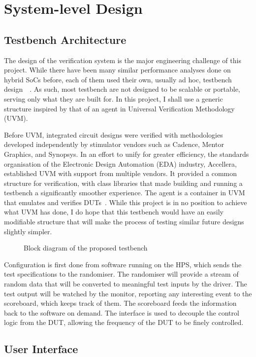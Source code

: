 \section{System-level Design}

\subsection{Testbench Architecture}
The design of the verification system is the major engineering challenge of this
project.
While there have been many similar performance analyses done on hybrid SoCs
before, each of them used their own, usually ad hoc, testbench
design~\cite{Shi1}~\cite{Li1}.
As such, most testbench are not designed to be scalable or portable, serving
only what they are built for.
In this project, I shall use a generic structure inspired by that of an agent
in Universal Verification Methodology (UVM).

Before UVM, integrated circuit designs were verified with methodologies
developed independently by stimulator vendors such as Cadence, Mentor Graphics,
and Synopsys.
In an effort to unify for greater efficiency, the standards organisation of the
Electronic Design Automation (EDA) industry, Accellera, established UVM with
support from multiple vendors.
It provided a common structure for verification, with class libraries that made
building and running a testbench a significantly smoother experience.
The agent is a container in UVM that emulates and verifies
DUTs~\cite{Accellera1}.
While this project is in no position to achieve what UVM has done, I do hope
that this testbench would have an easily modifiable structure that will make
the process of testing similar future designs slightly simpler.

\begin{figure}[H]
  \centering
  
  \caption{Block diagram of the proposed testbench}
  \label{Block}
\end{figure}

Configuration is first done from software running on the HPS, which sends
the test specifications to the randomiser.
The randomiser will provide a stream of random data that will be converted
to meaningful test inputs by the driver.
The test output will be watched by the monitor, reporting any interesting
event to the scoreboard, which keeps track of them.
The scoreboard feeds the information back to the software on demand.
The interface is used to decouple the control logic from the DUT, allowing
the frequency of the DUT to be finely controlled.

\subsection{User Interface}
